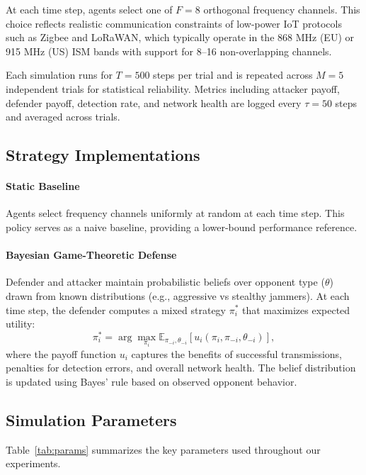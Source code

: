 \documentclass[conference]{IEEEtran}
\begin{document}
At each time step, agents select one of $F=8$ orthogonal frequency channels. This choice reflects realistic communication constraints of low-power IoT protocols such as Zigbee and LoRaWAN, which typically operate in the 868 MHz (EU) or 915 MHz (US) ISM bands with support for 8–16 non-overlapping channels.

Each simulation runs for $T=500$ steps per trial and is repeated across $M=5$ independent trials for statistical reliability. Metrics including attacker payoff, defender payoff, detection rate, and network health are logged every $\tau = 50$ steps and averaged across trials.

\subsection{Strategy Implementations}
\paragraph{Static Baseline}
Agents select frequency channels uniformly at random at each time step. This policy serves as a naive baseline, providing a lower-bound performance reference.

\paragraph{Bayesian Game-Theoretic Defense}
Defender and attacker maintain probabilistic beliefs over opponent type ($\theta$) drawn from known distributions (e.g., aggressive vs stealthy jammers). At each time step, the defender computes a mixed strategy $\pi_i^*$ that maximizes expected utility:
\[
\pi_i^* = \arg\max_{\pi_i} \mathbb{E}_{\pi_{-i},\theta_{-i}}[u_i(\pi_i,\pi_{-i},\theta_{-i})],
\]
where the payoff function $u_i$ captures the benefits of successful transmissions, penalties for detection errors, and overall network health. The belief distribution is updated using Bayes' rule based on observed opponent behavior.

\subsection{Simulation Parameters}
Table~\ref{tab:params} summarizes the key parameters used throughout our experiments.
\end{document}
